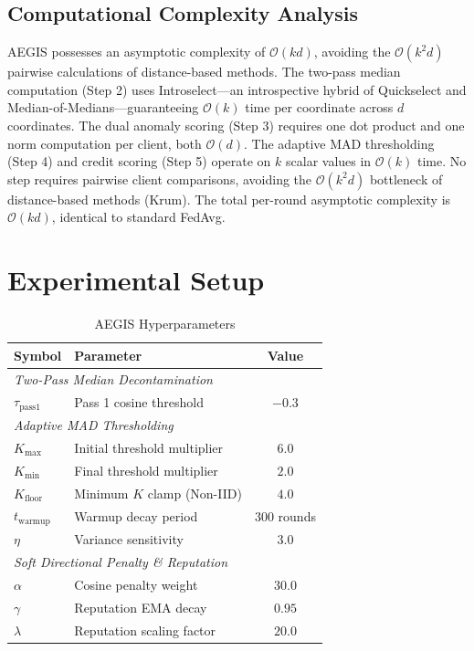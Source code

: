 \documentclass[10pt, conference]{IEEEtran}
\begin{document}
\subsection{Computational Complexity Analysis}
AEGIS possesses an asymptotic complexity of $\mathcal{O}(kd)$, avoiding the $\mathcal{O}(k^2d)$ pairwise calculations of distance-based methods. The two-pass median computation (Step 2) uses Introselect---an introspective hybrid of Quickselect and Median-of-Medians---guaranteeing $\mathcal{O}(k)$ time per coordinate across $d$ coordinates. The dual anomaly scoring (Step 3) requires one dot product and one norm computation per client, both $\mathcal{O}(d)$. The adaptive MAD thresholding (Step 4) and credit scoring (Step 5) operate on $k$ scalar values in $\mathcal{O}(k)$ time. No step requires pairwise client comparisons, avoiding the $\mathcal{O}(k^2 d)$ bottleneck of distance-based methods (Krum). The total per-round asymptotic complexity is $\mathcal{O}(kd)$, identical to standard FedAvg.

\section{Experimental Setup}

\begin{table}[htbp]
\centering
\caption{AEGIS Hyperparameters}
\label{tab:hyperparams}
\begin{tabular}{@{}llc@{}}
\toprule
\textbf{Symbol} & \textbf{Parameter} & \textbf{Value} \\ \midrule
\multicolumn{3}{l}{\textit{Two-Pass Median Decontamination}} \\
$\tau_{\text{pass1}}$ & Pass 1 cosine threshold & $-0.3$ \\ \midrule
\multicolumn{3}{l}{\textit{Adaptive MAD Thresholding}} \\
$K_{\max}$ & Initial threshold multiplier & $6.0$ \\
$K_{\min}$ & Final threshold multiplier & $2.0$ \\
$K_{\text{floor}}$ & Minimum $K$ clamp (Non-IID) & $4.0$ \\
$t_{\text{warmup}}$ & Warmup decay period & $300$ rounds \\
$\eta$ & Variance sensitivity & $3.0$ \\ \midrule
\multicolumn{3}{l}{\textit{Soft Directional Penalty \& Reputation}} \\
$\alpha$ & Cosine penalty weight & $30.0$ \\
$\gamma$ & Reputation EMA decay & $0.95$ \\
$\lambda$ & Reputation scaling factor & $20.0$ \\ \bottomrule
\end{tabular}
\end{table}
\end{document}
